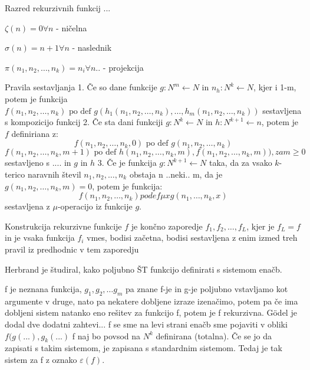 \documentclass[10pt,a4paper,oneside]{book}
\begin{document}
Razred rekurzivnih funkcij
...
\begin{items}
\item $\zeta(n)=0 \forall n$ - ničelna
\item $\sigma(n)=n+1 \forall n$ - naslednik
\item $\pi(n_1, n_2, \dots, n_k)=n_i \forall n..$ - projekcija
\end{items}
Pravila sestavljanja
1. Če so dane funkcije $g:N^m \leftarrow N$ in $n_h:N^k \leftarrow N$, kjer i 1-m, potem je funkcija $f(n_1,n_2,\dots,n_k) \mbox{ po def } g(h_{1}(n_1,n_2,\dots,n_k),\dots,h_m(n_1,n_2,\dots,n_k))$ sestavljena s kompozicijo funkcij
2. Če sta dani funkciji $g:N^k \leftarrow N$ in $h:N^{k+1}  \leftarrow n$, potem je $f$ definiriana z:
	\[f(n_1, n_2, \dots, n_k, 0) \mbox{ po def } g(n_1, n_2, \dots, n_k)\]
	\[f(n_1, n_2, \dots, n_k, m+1) \mbox{ po def } h(n_1, n_2, \dots, n_k, m), f(n_1, n_2, \dots, n_k, m)), za m \geq 0\]
sestavljeno s .... in $g$ in $h$
3. Če je funkcija $g:N^{k+1} \leftarrow N$ taka, da za vsako $k$-terico naravnih števil $n_1, n_2, \dots, n_k$ obstaja n ..neki.. m, da je $g(n_1, n_2, \dots, n_k, m) = 0$, potem je funkcija:
\[ f(n_1, n_2, \dots, n_k) po def \mu x g(n_1, \dots, n_k, x)\]
sestavljena z $\mu$-operacijo iz funkcije $g$.

Konstrukcija rekurzivne funkcije $f$ je končno zaporedje $f_1,f_2,\dots,f_L$, kjer je $f_L=f$ in je vsaka funkcija $f_i$ vmes, bodisi začetna, bodisi sestavljena z enim izmed treh pravil iz predhodnic v tem zaporedju %


Herbrand je študiral, kako poljubno ŠT funkcijo definirati s sistemom enačb.

f je neznana funkcija, $g_1, g_2, \dots g_m$ pa znane %
f-je in g-je poljubno vstavljamo kot argumente v druge, nato pa nekatere dobljene izraze izenačimo, potem pa če ima dobljeni sistem natanko eno rešitev za funkcijo f, potem je f rekurzivna.%
Gödel je dodal dve dodatni zahtevi... f se sme na levi strani enačb sme pojaviti v obliki $f(g(...), g_k(...)$ %
f naj bo povsod na $N^k$ definirana (totalna).
Če se jo da zapisati s takim sistemom, je zapisana s standardnim sistemom. Tedaj je tak sistem za f z oznako $\varepsilon(f)$.
\end{document}
